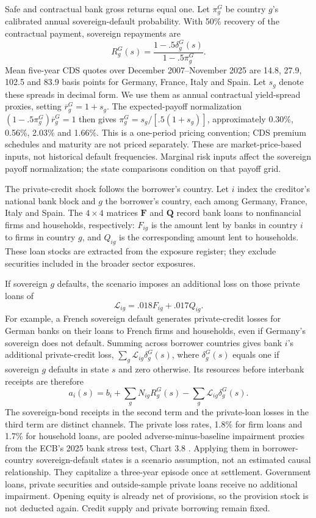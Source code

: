 Safe and contractual bank gross returns equal one. Let $\pi_g^G$ be country $g$'s calibrated annual sovereign-default probability. With 50\% recovery of the contractual payment, sovereign repayments are
\[
 R_g^G(s)=\frac{1-.5\delta_g^G(s)}{1-.5\pi_g^G}.
\]
Mean five-year CDS quotes over December 2007--November 2025 are 14.8, 27.9, 102.5 and 83.9 basis points for Germany, France, Italy and Spain. Let $s_g$ denote these spreads in decimal form. We use them as annual contractual yield-spread proxies, setting $\overline r_g^G=1+s_g$. The expected-payoff normalization $(1-.5\pi_g^G)\overline r_g^G=1$ then gives $\pi_g^G=s_g/[.5(1+s_g)]$, approximately 0.30\%, 0.56\%, 2.03\% and 1.66\%. This is a one-period pricing convention; CDS premium schedules and maturity are not priced separately. These are market-price-based inputs, not historical default frequencies. Marginal risk inputs affect the sovereign payoff normalization; the state comparisons condition on that payoff grid.

The private-credit shock follows the borrower's country. Let $i$ index the creditor's national bank block and $g$ the borrower's country, each among Germany, France, Italy and Spain. The $4\times4$ matrices $\mathbf{F}$ and $\mathbf{Q}$ record bank loans to nonfinancial firms and households, respectively: $F_{ig}$ is the amount lent by banks in country $i$ to firms in country $g$, and $Q_{ig}$ is the corresponding amount lent to households. These loan stocks are extracted from the exposure register; they exclude securities included in the broader sector exposures.

If sovereign $g$ defaults, the scenario imposes an additional loss on those private loans of
\[
 \mathcal L_{ig}=.018F_{ig}+.017Q_{ig}.
\]
For example, a French sovereign default generates private-credit losses for German banks on their loans to French firms and households, even if Germany's sovereign does not default. Summing across borrower countries gives bank $i$'s additional private-credit loss, $\sum_g\mathcal L_{ig}\delta_g^G(s)$, where $\delta_g^G(s)$ equals one if sovereign $g$ defaults in state $s$ and zero otherwise. Its resources before interbank receipts are therefore
\[
 a_i(s)=b_i+\sum_gN_{ig}R_g^G(s)-\sum_g\mathcal L_{ig}\delta_g^G(s).
\]
The sovereign-bond receipts in the second term and the private-loan losses in the third term are distinct channels. The private loss rates, 1.8\% for firm loans and 1.7\% for household loans, are pooled adverse-minus-baseline impairment proxies from the ECB's 2025 bank stress test, Chart 3.8 \citep{ECBStress2025}. Applying them in borrower-country sovereign-default states is a scenario assumption, not an estimated causal relationship. They capitalize a three-year episode once at settlement. Government loans, private securities and outside-sample private loans receive no additional impairment. Opening equity is already net of provisions, so the provision stock is not deducted again. Credit supply and private borrowing remain fixed.

